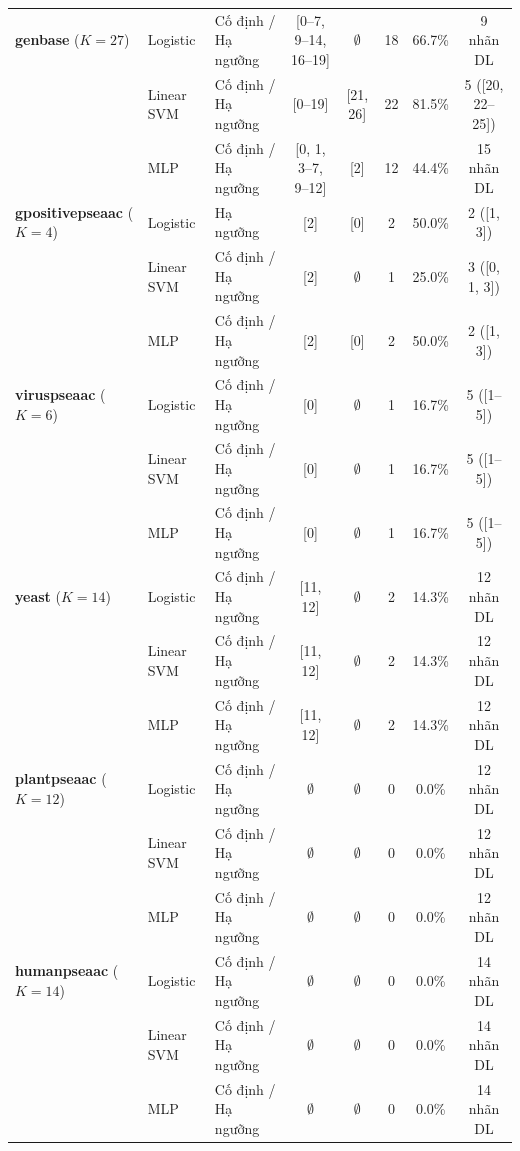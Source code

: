\documentclass[10pt,a4paper,twoside]{article}
\begin{document}
\begin{table}[H]
{\begin{tabular}{lllccccc}
\midrule
\textbf{genbase} ($K=27$) & Logistic & Cố định / Hạ ngưỡng & [0--7, 9--14, 16--19] & $\emptyset$ & 18 & 66.7\% & 9 nhãn DL \\
 & Linear SVM & Cố định / Hạ ngưỡng & [0--19] & [21, 26] & 22 & 81.5\% & 5 ([20, 22--25]) \\
 & MLP & Cố định / Hạ ngưỡng & [0, 1, 3--7, 9--12] & [2] & 12 & 44.4\% & 15 nhãn DL \\
\midrule
\textbf{gpositivepseaac} ($K=4$) & Logistic & Hạ ngưỡng & [2] & [0] & 2 & 50.0\% & 2 ([1, 3]) \\
 & Linear SVM & Cố định / Hạ ngưỡng & [2] & $\emptyset$ & 1 & 25.0\% & 3 ([0, 1, 3]) \\
 & MLP & Cố định / Hạ ngưỡng & [2] & [0] & 2 & 50.0\% & 2 ([1, 3]) \\
\midrule
\textbf{viruspseaac} ($K=6$) & Logistic & Cố định / Hạ ngưỡng & [0] & $\emptyset$ & 1 & 16.7\% & 5 ([1--5]) \\
 & Linear SVM & Cố định / Hạ ngưỡng & [0] & $\emptyset$ & 1 & 16.7\% & 5 ([1--5]) \\
 & MLP & Cố định / Hạ ngưỡng & [0] & $\emptyset$ & 1 & 16.7\% & 5 ([1--5]) \\
\midrule
\textbf{yeast} ($K=14$) & Logistic & Cố định / Hạ ngưỡng & [11, 12] & $\emptyset$ & 2 & 14.3\% & 12 nhãn DL \\
 & Linear SVM & Cố định / Hạ ngưỡng & [11, 12] & $\emptyset$ & 2 & 14.3\% & 12 nhãn DL \\
 & MLP & Cố định / Hạ ngưỡng & [11, 12] & $\emptyset$ & 2 & 14.3\% & 12 nhãn DL \\
\midrule
\textbf{plantpseaac} ($K=12$) & Logistic & Cố định / Hạ ngưỡng & $\emptyset$ & $\emptyset$ & 0 & 0.0\% & 12 nhãn DL \\
 & Linear SVM & Cố định / Hạ ngưỡng & $\emptyset$ & $\emptyset$ & 0 & 0.0\% & 12 nhãn DL \\
 & MLP & Cố định / Hạ ngưỡng & $\emptyset$ & $\emptyset$ & 0 & 0.0\% & 12 nhãn DL \\
\midrule
\textbf{humanpseaac} ($K=14$) & Logistic & Cố định / Hạ ngưỡng & $\emptyset$ & $\emptyset$ & 0 & 0.0\% & 14 nhãn DL \\
 & Linear SVM & Cố định / Hạ ngưỡng & $\emptyset$ & $\emptyset$ & 0 & 0.0\% & 14 nhãn DL \\
 & MLP & Cố định / Hạ ngưỡng & $\emptyset$ & $\emptyset$ & 0 & 0.0\% & 14 nhãn DL \\
\bottomrule
\end{tabular}%
}
\end{table}
\end{document}
